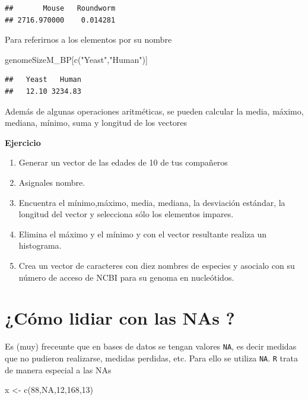 \documentclass[
]{book}
\newenvironment{Shaded}{\begin{snugshade}}{\end{snugshade}}
\newcommand{\ConstantTok}[1]{\textcolor[rgb]{0.00,0.00,0.00}{#1}}
\newcommand{\DecValTok}[1]{\textcolor[rgb]{0.00,0.00,0.81}{#1}}
\newcommand{\FunctionTok}[1]{\textcolor[rgb]{0.00,0.00,0.00}{#1}}
\newcommand{\NormalTok}[1]{#1}
\newcommand{\OtherTok}[1]{\textcolor[rgb]{0.56,0.35,0.01}{#1}}
\newcommand{\StringTok}[1]{\textcolor[rgb]{0.31,0.60,0.02}{#1}}
\providecommand{\tightlist}{%
  \setlength{\itemsep}{0pt}\setlength{\parskip}{0pt}}
\begin{document}
\begin{verbatim}
##       Mouse   Roundworm 
## 2716.970000    0.014281
\end{verbatim}

Para referirnos a los elementos por su nombre

\begin{Shaded}
\begin{Highlighting}[]
\NormalTok{genomeSizeM\_BP[}\FunctionTok{c}\NormalTok{(}\StringTok{"Yeast"}\NormalTok{,}\StringTok{"Human"}\NormalTok{)]}
\end{Highlighting}
\end{Shaded}

\begin{verbatim}
##   Yeast   Human 
##   12.10 3234.83
\end{verbatim}

Además de algunas operaciones aritméticas, se pueden calcular la media, máximo, mediana, mínimo, suma y longitud de los vectores

\textbf{Ejercicio}

\begin{enumerate}
\def\labelenumi{\arabic{enumi}.}
\tightlist
\item
  Generar un vector de las edades de 10 de tus compañeros
\item
  Asignales nombre.
\item
  Encuentra el mínimo,máximo, media, mediana, la desviación estándar, la longitud del vector y selecciona sólo los elementos impares.
\item
  Elimina el máximo y el mínimo y con el vector resultante realiza un histograma.
\item
  Crea un vector de caracteres con diez nombres de especies y asocialo con su número de acceso de NCBI para su genoma en nucleótidos.
\end{enumerate}

\hypertarget{cuxf3mo-lidiar-con-las-nas}{%
\section{¿Cómo lidiar con las NAs ?}\label{cuxf3mo-lidiar-con-las-nas}}

Es (muy) freceunte que en bases de datos se tengan valores \texttt{NA}, es decir medidas que no pudieron realizarse, medidas perdidas, etc. Para ello se utiliza \texttt{NA}. \texttt{R} trata de manera especial a las NAs

\begin{Shaded}
\begin{Highlighting}[]
\NormalTok{x }\OtherTok{\textless{}{-}} \FunctionTok{c}\NormalTok{(}\DecValTok{88}\NormalTok{,}\ConstantTok{NA}\NormalTok{,}\DecValTok{12}\NormalTok{,}\DecValTok{168}\NormalTok{,}\DecValTok{13}\NormalTok{)}
\end{Highlighting}
\end{Shaded}
\end{document}
